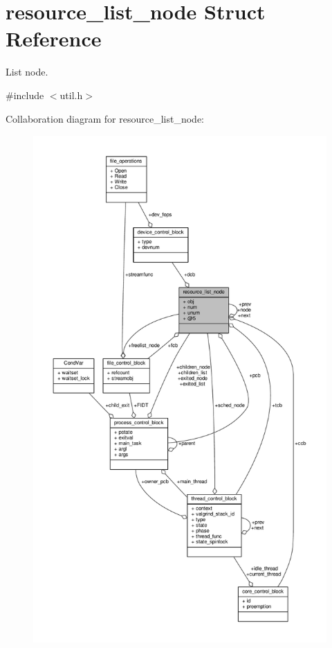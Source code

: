 \hypertarget{structresource__list__node}{\section{resource\-\_\-list\-\_\-node Struct Reference}
\label{structresource__list__node}
}


List node.  




{\ttfamily \#include $<$util.\-h$>$}



Collaboration diagram for resource\-\_\-list\-\_\-node\-:
\nopagebreak
\begin{figure}[H]
\begin{center}
\leavevmode
\includegraphics[height=550pt]{structresource__list__node__coll__graph}
\end{center}
\end{figure}
